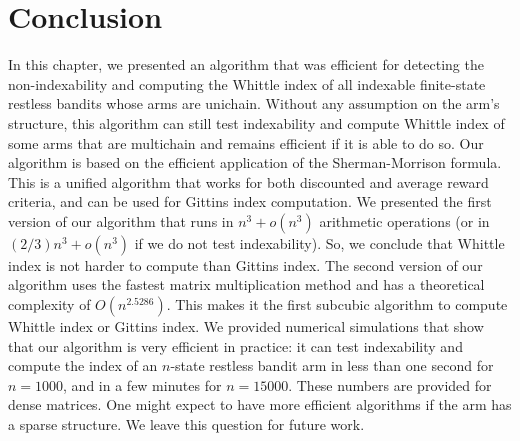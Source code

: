 \section{Conclusion}
\label{sec:conclusion}

In this chapter, we presented an algorithm that was efficient for detecting the non-indexability and computing the Whittle index of all indexable finite-state restless bandits whose arms are unichain. Without any assumption on the arm's structure, this algorithm can still test indexability and compute Whittle index of some arms that are multichain and remains efficient if it is able to do so.
Our algorithm is based on the efficient application of the Sherman-Morrison formula. This is a unified algorithm that works for both discounted and average reward criteria, and can be used for Gittins index computation.  We presented the first version of our algorithm that runs in $n^3+o(n^3)$ arithmetic operations (or in $(2/3)n^3+o(n^3)$ if we do not test indexability). So, we conclude that Whittle index is not harder to compute than Gittins index. The second version of our algorithm uses the fastest matrix multiplication method and has a theoretical complexity of $O(n^{2.5286})$. This makes it the first subcubic algorithm to compute Whittle index or Gittins index. We provided numerical simulations that show that our algorithm is very efficient in practice: it can test indexability and compute the index of an $n$-state restless bandit arm in less than one second for $n=1000$, and in a few minutes for $n=15000$. These numbers are provided for dense matrices. One might expect to have more efficient algorithms if the arm has a sparse structure. We leave this question for future work. 

\newpage

